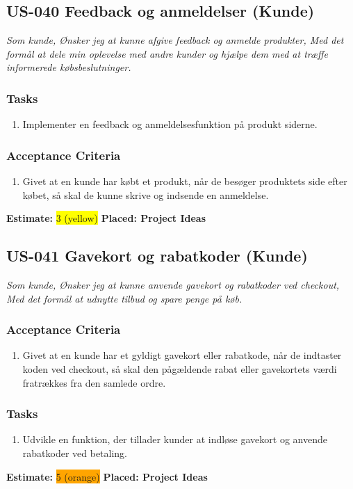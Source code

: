 \subsection{US-040 Feedback og anmeldelser (Kunde)}
\label{sec:US-040}
\textit{Som kunde, Ønsker jeg at kunne afgive feedback og anmelde produkter, Med det formål at dele min oplevelse med andre kunder og hjælpe dem med at træffe informerede købsbeslutninger.}
\subsubsection*{\textbf{Tasks}}
\begin{enumerate}
  \item Implementer en feedback og anmeldelsesfunktion på produkt siderne.
\end{enumerate}
\subsubsection*{\textbf{Acceptance Criteria}}
\begin{enumerate}
  \item Givet at en kunde har købt et produkt, når de besøger produktets side efter købet, så skal de kunne skrive og indsende en anmeldelse.
\end{enumerate}
\textbf{Estimate:} \colorbox{yellow}{3 (yellow)}
\textbf{Placed: Project Ideas}
\par\noindent\dotfill

\subsection{US-041 Gavekort og rabatkoder (Kunde)}
\label{sec:US-041}
\textit{Som kunde, Ønsker jeg at kunne anvende gavekort og rabatkoder ved checkout, Med det formål at udnytte tilbud og spare penge på køb.}
\subsubsection*{\textbf{Acceptance Criteria}}
\begin{enumerate}
  \item Givet at en kunde har et gyldigt gavekort eller rabatkode, når de indtaster koden ved checkout, så skal den pågældende rabat eller gavekortets værdi fratrækkes fra den samlede ordre.
\end{enumerate}
\subsubsection*{\textbf{Tasks}}
\begin{enumerate}
  \item Udvikle en funktion, der tillader kunder at indløse gavekort og anvende rabatkoder ved betaling.
\end{enumerate}
\textbf{Estimate:} \colorbox{orange}{5 (orange)}
\textbf{Placed: Project Ideas}
\par\noindent\dotfill